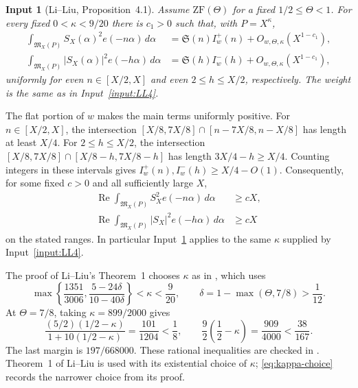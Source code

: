 \documentclass[11pt]{article}
\newtheorem{inputthm}[theorem]{Input}
\theoremstyle{definition}
\theoremstyle{remark}
\numberwithin{equation}{section}
\newcommand{\M}{\mathfrak M}
\DeclareMathOperator{\Rea}{Re}
\begin{document}
\begin{inputthm}[Li--Liu, Proposition~4.1]\label{input:LLmajor}
Assume $\mathrm{ZF}(\Theta)$ for a fixed $1/2\le\Theta<1$.
For every fixed $0<\kappa<9/20$ there is $c_1>0$ such that, with
$P=X^\kappa$,
\begin{align}
 \int_{\M_X(P)}S_X(\alpha)^2e(-n\alpha)\,d\alpha
   &=\mathfrak S(n)I_w^+(n)+O_{w,\Theta,\kappa}(X^{1-c_1}),
               \label{eq:LLmajorplus}\\
 \int_{\M_X(P)}|S_X(\alpha)|^2e(-h\alpha)\,d\alpha
   &=\mathfrak S(h)I_w^-(h)+O_{w,\Theta,\kappa}(X^{1-c_1}),
               \label{eq:LLmajorminus}
\end{align}
uniformly for even $n\in[X/2,X]$ and even $2\le h\le X/2$,
respectively. The weight is the same as in Input~\ref{input:LL4}.
\end{inputthm}

The flat portion of $w$ makes the main terms uniformly positive.
For $n\in[X/2,X]$, the intersection
$[X/8,7X/8]\cap[n-7X/8,n-X/8]$ has length at least $X/4$.
For $2\le h\le X/2$, the intersection
$[X/8,7X/8]\cap[X/8-h,7X/8-h]$ has length
$3X/4-h\ge X/4$. Counting integers in these intervals gives
$I_w^+(n),I_w^-(h)\ge X/4-O(1)$. Consequently, for some fixed $c>0$
and all sufficiently large $X$,
\begin{align}
 \Rea\int_{\M_X(P)}S_X^2 e(-n\alpha)\,d\alpha&\ge cX,
                    \label{eq:LLpositiveplus}\\
 \Rea\int_{\M_X(P)}|S_X|^2 e(-h\alpha)\,d\alpha&\ge cX
                    \label{eq:LLpositiveminus}
\end{align}
on the stated ranges. In particular Input~\ref{input:LLmajor} applies
to the same $\kappa$ supplied by Input~\ref{input:LL4}.

The proof of Li--Liu's Theorem~1 chooses $\kappa$ as in
\cite[Proposition~9.4]{LL}, which uses
\begin{equation}\label{eq:kappa-choice}
 \max\left\{\frac{1351}{3006},\frac{5-24\delta}{10-40\delta}\right\}
       <\kappa<\frac9{20},\qquad
 \delta=1-\max(\Theta,7/8)>\frac1{12}.
\end{equation}
At $\Theta=7/8$, taking $\kappa=899/2000$ gives
\begin{equation}\label{eq:kappa-exact}
 \frac{(5/2)(1/2-\kappa)}{1+10(1/2-\kappa)}=\frac{101}{1204}<\frac18,
 \qquad
 \frac92\left(\frac12-\kappa\right)=\frac{909}{4000}<\frac{38}{167}.
\end{equation}
The last margin is $197/668000$. These rational inequalities are
checked in . Theorem~1 of Li--Liu is used
with its existential choice of $\kappa$; \eqref{eq:kappa-choice}
records the narrower choice from its proof.
\end{document}

